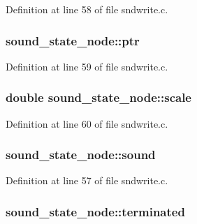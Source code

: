 Definition at line 58 of file sndwrite.\+c.

\subsubsection[{\texorpdfstring{ptr}{ptr}}]{ sound\+\_\+state\+\_\+node\+::ptr}\hypertarget{structsound__state__node_a985df8a24502d32ae7ca457a4967b0ec}{}\label{structsound__state__node_a985df8a24502d32ae7ca457a4967b0ec}


Definition at line 59 of file sndwrite.\+c.

\subsubsection[{\texorpdfstring{scale}{scale}}]{\setlength{\rightskip}{0pt plus 5cm}double sound\+\_\+state\+\_\+node\+::scale}\hypertarget{structsound__state__node_a4db26c84fd8b8ec619f6128596763d1e}{}\label{structsound__state__node_a4db26c84fd8b8ec619f6128596763d1e}


Definition at line 60 of file sndwrite.\+c.

\subsubsection[{\texorpdfstring{sound}{sound}}]{ sound\+\_\+state\+\_\+node\+::sound}\hypertarget{structsound__state__node_a54b246ec115000276810d3646b9063e3}{}\label{structsound__state__node_a54b246ec115000276810d3646b9063e3}


Definition at line 57 of file sndwrite.\+c.

\subsubsection[{\texorpdfstring{terminated}{terminated}}]{ sound\+\_\+state\+\_\+node\+::terminated}\hypertarget{structsound__state__node_a54e0ea7b81a157d790858a267be897d3}{}\label{structsound__state__node_a54e0ea7b81a157d790858a267be897d3}


